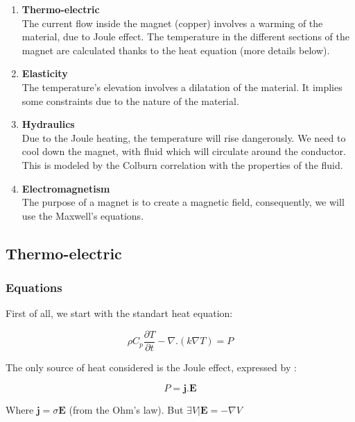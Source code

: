 \documentclass[11pt]{amsart}
\begin{document}
\begin{enumerate}

\item{\textbf{Thermo-electric} \\
The current flow inside the magnet (copper) involves a warming of the material, due to Joule effect.
The temperature in the different sections of the magnet are calculated thanks to the heat equation (more details below).}

\item{\textbf{Elasticity} \\
The temperature’s elevation involves a dilatation of the material. It implies some constraints due to the nature of the material.}

\item{\textbf{Hydraulics} \\
Due to the Joule heating, the temperature will rise dangerously.
We need to cool down the magnet, with fluid which will circulate around the conductor.
This is modeled by the Colburn correlation with the properties of the fluid.}

\item{\textbf{Electromagnetism} \\
The purpose of a magnet is to create a magnetic field, consequently, we will use the Maxwell’s equations.}

\end{enumerate}


\hypertarget{x-thermo-electric}{\subsection{Thermo-electric}}
\hypertarget{x-equations}{\subsubsection{Equations}}
First of all, we start with the standart heat equation:



\[
\rho C_{p}\frac{\partial T}{\partial t} - \nabla.(k \nabla T)=P
\]



The only source of heat considered is the Joule effect, expressed by :



\[
P=\textbf{j.E}
\]



Where $\textbf{j}=\sigma\textbf{E}$  (from the Ohm’s law).
But $\exists V | \textbf{E}=-\nabla V$
\end{document}
